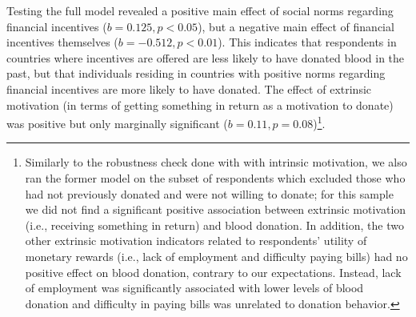 \documentclass[AER]{AEA}
\begin{document}
Testing the full model revealed a positive main effect of social norms regarding financial incentives ($b = 0.125, p < 0.05$), but a negative main effect of financial incentives themselves ($b = -0.512, p < 0.01$). This indicates that respondents in countries where incentives are offered are less likely to have donated blood in the past, but that individuals residing in countries with positive norms regarding financial incentives are more likely to have donated. The effect of extrinsic motivation (in terms of getting something in return as a motivation to donate) was positive but only marginally significant ($b = 0.11, p = 0.08$)\footnote{Similarly to the robustness check done with with intrinsic motivation, we also ran the former model on the subset of respondents which excluded those who had not previously donated and were not willing to donate; for this sample we did not find a significant positive association between extrinsic motivation (i.e., receiving something in return) and blood donation. In addition, the two other extrinsic motivation indicators related to respondents’ utility of monetary rewards (i.e., lack of employment and difficulty paying bills) had no positive effect on blood donation, contrary to our expectations. Instead, lack of employment was significantly associated with lower levels of blood donation and difficulty in paying bills was unrelated to donation behavior.}.
\end{document}
